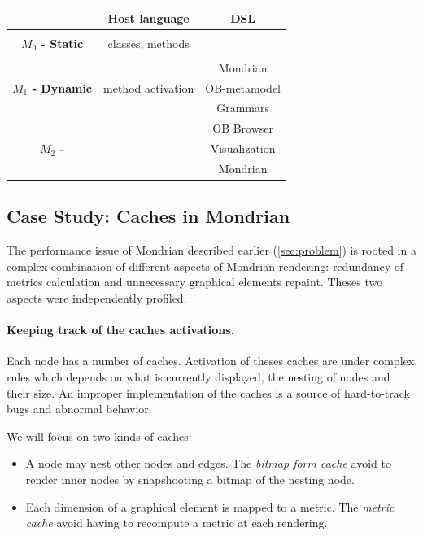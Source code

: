 \documentclass[runningheads]{llncs}
\newcommand{\ab}[1]{\nb{Alexandre}{blue}{#1}}
\newcommand{\jr}[1]{\nb{Jorge}{cyan}{#1}}
\begin{document}
\begin{tabular}{c|c|c}
					&	\textbf{Host language} 	& \textbf{DSL} \\ \hline
					&						& 		\\
\textbf{$M_0$ - Static}	&	classes, methods		& 		\\
					&						& 		\\\hline
					&						& Mondrian\\
\textbf{$M_1$ - Dynamic}	&	method activation		& OB-metamodel\\
					&						& Grammars\\ \hline
					&						& OB Browser\\
\textbf{$M_2$ -} 		&						& Visualization\\
					&						& Mondrian
\end{tabular}


\subsection{Case Study: Caches in Mondrian}


The performance issue of Mondrian described earlier (\autoref{sec:problem}) is rooted in a complex combination of different aspects of Mondrian rendering: redundancy of metrics calculation and unnecessary graphical elements repaint. Theses two aspects were independently profiled.

\paragraph{Keeping track of the caches activations.}
Each node has a number of caches. Activation of theses caches are under complex rules which depends on what is currently displayed, the nesting of nodes and their size. An improper implementation of the caches is a source of hard-to-track bugs and abnormal behavior.

We will focus on two kinds of caches: 
\begin{itemize}
\item A node may nest other nodes and edges. The \emph{bitmap form cache} avoid to render inner nodes by snapshooting a bitmap of the nesting node.
\item Each dimension of a graphical element is mapped to a metric. The \emph{metric cache} avoid having to recompute a metric at each rendering.
\end{itemize}
\end{document}
